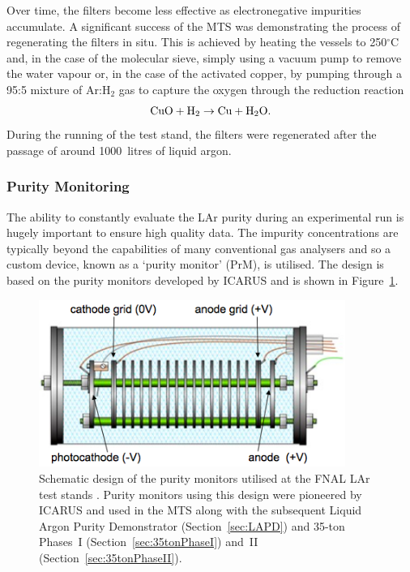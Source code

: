 Over time, the filters become less effective as electronegative impurities accumulate.  A significant success of the MTS was demonstrating the process of regenerating the filters in situ.  This is achieved by heating the vessels to 250$^{\circ}$C and, in the case of the molecular sieve, simply using a vacuum pump to remove the water vapour or, in the case of the activated copper, by pumping through a 95:5 mixture of Ar:H$_2$ gas to capture the oxygen through the reduction reaction
\begin{equation}
  \textnormal{CuO} + \textnormal{H}_2 \rightarrow \textnormal{Cu} + \textnormal{H}_2\textnormal{O}.
\end{equation}
During the running of the test stand, the filters were regenerated after the passage of around 1000~litres of liquid argon.

\subsubsection{Purity Monitoring}\label{sec:PurityMonitoring}

The ability to constantly evaluate the LAr purity during an experimental run is hugely important to ensure high quality data.  The impurity concentrations are typically beyond the capabilities of many conventional gas analysers and so a custom device, known as a `purity monitor' (PrM), is utilised.  The design is based on the purity monitors developed by ICARUS \cite{ICARUSPurityMonitor} and is shown in Figure~\ref{fig:PurityMonitor}.

\begin{figure}
  \centering
  \includegraphics[width=10cm]{PurityMonitor.png}
  \caption[Schematic design of the purity monitors utilised at the FNAL LAr test stands.]{Schematic design of the purity monitors utilised at the FNAL LAr test stands \cite{35tonPhaseI2014}.  Purity monitors using this design were pioneered by ICARUS \cite{ICARUSPurityMonitor} and used in the MTS along with the subsequent Liquid Argon Purity Demonstrator (Section~\ref{sec:LAPD}) and 35-ton Phases~I (Section~\ref{sec:35tonPhaseI}) and~II (Section~\ref{sec:35tonPhaseII}).}
  \label{fig:PurityMonitor}
\end{figure}

